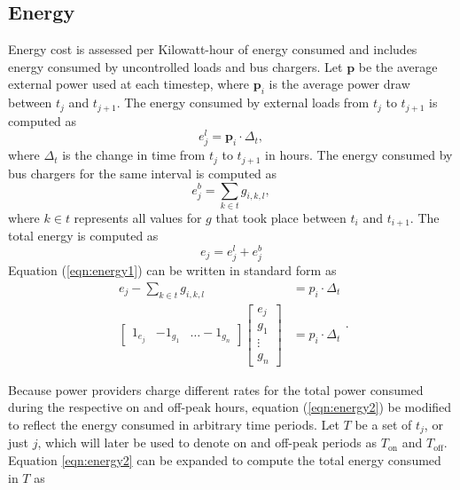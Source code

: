 \subsection{Energy}
\par Energy cost is assessed per Kilowatt-hour of energy consumed and includes energy consumed by uncontrolled loads and bus chargers. Let $\mathbf{p}$ be the average external power used at each timestep, where $\mathbf{p}_i$ is the average power draw between $t_j$ and $t_{j + 1}$. The energy consumed by external loads from $t_j$ to $t_{j+1}$ is computed as 
\begin{equation}
	e^l_j = \mathbf{p}_i \cdot \Delta_t,
\end{equation}
where $\Delta_t$ is the change in time from $t_j$ to $t_{j+1}$ in hours. The energy consumed by bus chargers for the same interval is computed as  
\begin{equation}
	e^b_j = \sum_{k\in t}g_{i,k,l},	
\end{equation}
where $k\in t$ represents all values for $g$ that took place between $t_i$ and $t_{i+1}$.
The total energy is computed as 
\begin{equation}\label{eqn:energy1}
	e_j = e^l_j + e^b_j
\end{equation}
Equation (\ref{eqn:energy1}) can be written in standard form as 
\begin{equation}\label{eqn:energy2}
	\begin{aligned}
		e_j -\sum_{k\in t}g_{i,k,l} &= p_i \cdot \Delta_t \\
		\begin{bmatrix} 1_{e_j} & -1_{g_1} & \hdots -1_{g_n} \end{bmatrix} \begin{bmatrix}e_j \\ g_1 \\ \vdots \\ g_n \end{bmatrix} &= p_i \cdot \Delta_t
	\end{aligned}.
\end{equation}
\par Because power providers charge different rates for the total power consumed during the respective on and off-peak hours,  equation (\ref{eqn:energy2}) be modified to reflect the energy consumed in arbitrary time periods.  Let $T$ be a set of $t_j$, or just $j$, which will later be used to denote on and off-peak periods as $T_{\text{on}}$ and $T_{\text{off}}$. Equation \ref{eqn:energy2} can be expanded to compute the total energy consumed in $T$ as
